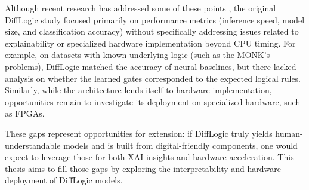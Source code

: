 Although recent research has addressed some of these points \cite{explogic}, the original DiffLogic study focused primarily on performance metrics (inference speed, model size, and classification accuracy) without specifically addressing issues related to explainability or specialized hardware implementation beyond CPU timing. For example, on datasets with known underlying logic (such as the MONK’s problems), DiffLogic matched the accuracy of neural baselines, but there lacked analysis on whether the learned gates corresponded to the expected logical rules. Similarly, while the architecture lends itself to hardware implementation, opportunities remain to investigate its deployment on specialized hardware, such as FPGAs.

These gaps represent opportunities for extension: if DiffLogic truly yields human-understandable models and is built from digital-friendly components, one would expect to leverage those for both XAI insights and hardware acceleration. This thesis aims to fill those gaps by exploring the interpretability and hardware deployment of DiffLogic models.





% 








